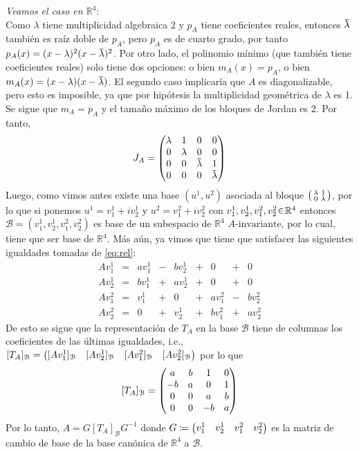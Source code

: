 \begin{sol}
\begin{enumerate}[leftmargin=*, label=(\alph*)]
\emph{Veamos el caso en $\mathbb{R}^4$}:\\
Como $\lambda$ tiene multiplicidad algebraica 2 y $p_A$ tiene coeficientes reales, entonces $\ubar{\lambda}$ también es raíz doble de $p_A$, pero $p_A$ es de cuarto grado, por tanto $p_A(x) = (x-\lambda)^2(x-\ubar{\lambda})^2$. Por otro lado, el polinomio mínimo (que también tiene coeficientes reales) solo tiene dos opciones: o bien $m_A(x) = p_A$, o bien $m_A(x) = (x - \lambda)(x - \ubar{\lambda})$. El segundo caso implicaría que $A$ es diagonalizable, pero esto es imposible, ya que por hipótesis la multiplicidad geométrica de $\lambda$ es 1. Se sigue que $m_A = p_A$ y el tamaño máximo de los bloques de Jordan es 2. Por tanto,
\[
J_A = \mqty(%
\lambda&   1   &      0     &     0    \\
   0   &\lambda&      0     &     0    \\
   0   &   0   &\ubar\lambda&     1    \\
   0   &   0   &      0     &\ubar\lambda   
)
\]
Luego, como vimos antes existe una base $(u^1,u^2)$ asociada al bloque $\smqty(\lambda&1\\0&\lambda)$, por lo que si ponemos $u^1 = v^1_1 + iv^1_2$ y $u^2 = v^2_1 + iv^2_2$ con $v^1_1,v^1_2,v^2_1,v^2_2\en\mathbb{R}^4$ entonces $\mathcal{B} = (v^1_1,v^1_2,v^2_1,v^2_2)$ es base de un subespacio de $\mathbb{R}^4$ $A\text{-invariante}$, por lo cual, tiene que ser base de $\mathbb{R}^4$. Más aún, ya vimos que tiene que satisfacer las siguientes igualdades tomadas de \eqref{eq:rel}:
\[\begin{matrix}
Av^1_1 &=& av^1_1 &-& bv^1_2 &+& 0 &+& 0\\[5pt]
Av^1_2 &=& bv^1_1 &+& av^1_2 &+& 0 &+& 0\\[5pt]
Av^2_1 &=& v^1_1 &+& 0 &+& av^2_1 &-& bv^2_2\\[5pt]
Av^2_2 &=& 0 &+& v^1_2 &+& bv^2_1 &+& av^2_2
\end{matrix}\]
De esto se sigue que la representación de $T_A$ en la base $\mathcal{B}$ tiene de columnas los coeficientes de las últimas igualdades, i.e., $[T_A]_{\mathcal{B}} = \mqty([Av^1_1]_\mathcal{B} & [Av^1_2]_\mathcal{B} & [Av^2_1]_\mathcal{B} & [Av^2_2]_\mathcal{B})$ por lo que
\[
[T_A]_\mathcal{B}%
= \mqty(%
 a & b &  1 & 0 \\
-b & a &  0 & 1 \\
 0 & 0 &  a & b \\
 0 & 0 & -b & a
)
\]
Por lo tanto, $A = G[T_A]_\mathcal{B}G^{-1}$ donde $G \coloneq \mqty(v^1_1&v^1_2&v^2_1&v^2_2)$ es la matriz de cambio de base de la base canónica de $\mathbb{R}^4$ a $\mathcal{B}$.


\end{enumerate}
\end{sol}
